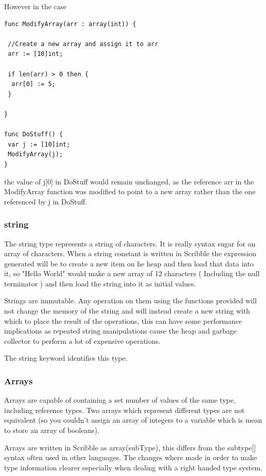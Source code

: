 \documentclass[]{final_report}
\begin{document}
However in the case
\begin{verbatim}
func ModifyArray(arr : array(int)) {

 //Create a new array and assign it to arr
 arr := [10]int;

 if len(arr) > 0 then {
  arr[0] := 5;
 }

}

func DoStuff() {
 var j := [10]int;
 ModifyArray(j);
}
\end{verbatim}
the value of j[0] in DoStuff would remain unchanged, as the reference arr in the ModifyArray function was modified to point to a new array rather than the one referenced by j in DoStuff.

\subsubsection{string}

The string type represents a string of characters. It is really syntax sugar for an array of characters. When a string constant is written in Scribble the expression generated will be to create a new item on he heap and then load that data into it, so "Hello World" would make a new array of 12 characters ( Including the null terminator ) and then load the string into it as initial values.

Strings are immutable. Any operation on them using the functions provided will not change the memory of the string and will instead create a new string with which to place the result of the operations, this can have some performance implications as repeated string manipulations cause the heap and garbage collector to perform a lot of expensive operations.

The string keyword identifies this type.

\subsubsection{Arrays}

Arrays are capable of containing a set number of values of the same type, including reference types. Two arrays which represent different types are not equivalent (so you couldn't assign an array of integers to a variable which is mean to store an array of booleans).

Arrays are written in Scribble as array(subType), this differs from the subtype[] syntax often used in other languages. The changes where made in order to make type information clearer especially when dealing with a right handed type system.
\end{document}

